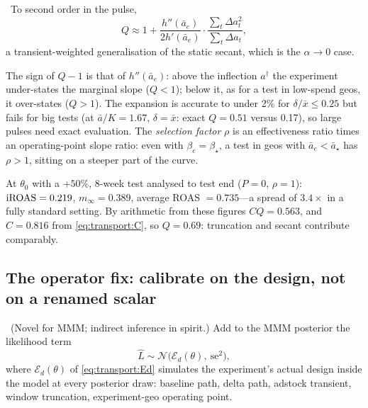 \begin{proposition}
\label{transport:prop:Q}
\tagEstablished\ To second order in the pulse,
\begin{equation}
Q \approx 1 + \frac{h''(\bar a_e)}{2h'(\bar a_e)}\cdot\frac{\sum_t \Delta a_t^2}{\sum_t \Delta a_t},
\label{eq:transport:Q}
\end{equation}
a transient-weighted generalisation of the static secant, which is the $\alpha \to 0$ case.
\end{proposition}

The sign of $Q - 1$ is that of $h''(\bar a_e)$: above the inflection $a^\dagger$ the experiment under-states the marginal slope ($Q < 1$); below it, as for a test in low-spend geos, it over-states ($Q > 1$). The expansion is accurate to under 2\% for $\delta/\bar x \le 0.25$ but fails for big tests (at $\bar a/K = 1.67$, $\delta = \bar x$: exact $Q = 0.51$ versus 0.17), so large pulses need exact evaluation. The \emph{selection factor} $\rho$ is an effectiveness ratio times an operating-point slope ratio: even with $\beta_e = \beta_\star$, a test in geos with $\bar a_e < \bar a_\star$ has $\rho > 1$, sitting on a steeper part of the curve.

\begin{example}
\label{transport:ex:three}
At $\theta_0$ with a $+50\%$, 8-week test analysed to test end ($P = 0$, $\rho = 1$): $\mathrm{iROAS} = 0.219$, $m_\infty = 0.389$, average ROAS $= 0.735$---a spread of $3.4\times$ in a fully standard setting. By arithmetic from these figures $CQ = 0.563$, and $C = 0.816$ from \cref{eq:transport:C}, so $Q = 0.69$: truncation and secant contribute comparably.
\end{example}

\subsection{The operator fix: calibrate on the design, not on a renamed scalar}

\begin{construction}
\label{transport:con:operator}
\tagEstablished\ (Novel for MMM; indirect inference in spirit.) Add to the MMM posterior the likelihood term
\begin{equation}
\hat L \sim \mathcal N\big(\mathcal E_d(\theta),\ \mathrm{se}^2\big),
\label{eq:transport:operator}
\end{equation}
where $\mathcal E_d(\theta)$ of \cref{eq:transport:Ed} simulates the experiment's actual design inside the model at every posterior draw: baseline path, delta path, adstock transient, window truncation, experiment-geo operating point.
\end{construction}

